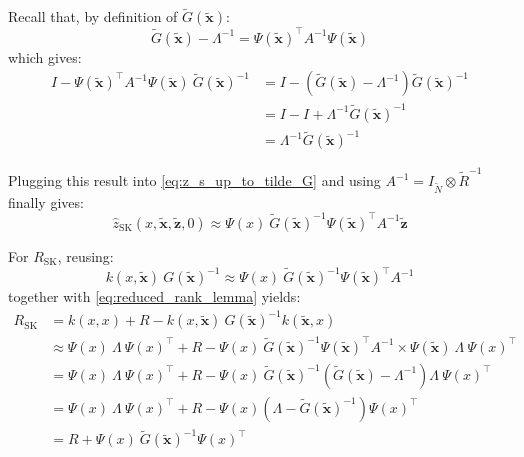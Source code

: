 Recall that, by definition of $\tilde{G}(\tilde{\mathbf{x}})$:
\begin{equation}
	\tilde{G}(\tilde{\mathbf{x}})-\Lambda^{-1}=\Psi(\tilde{\mathbf{x}})^\top A^{-1}\Psi(\tilde{\mathbf{x}})
\end{equation}
which gives:
\begin{equation}
	\begin{aligned}
	I-\Psi(\tilde{\mathbf{x}})^\top A^{-1}\Psi(\tilde{\mathbf{x}})\:\tilde{G}(\tilde{\mathbf{x}})^{-1}&=I-\left(\tilde{G}(\tilde{\mathbf{x}})-\Lambda^{-1}\right)\tilde{G}(\tilde{\mathbf{x}})^{-1}\\
	&=I-I+\Lambda^{-1}\tilde{G}(\tilde{\mathbf{x}})^{-1}\\
	&=\Lambda^{-1}\tilde{G}(\tilde{\mathbf{x}})^{-1}
	\end{aligned}\label{eq:reduced_rank_lemma}
\end{equation}

Plugging this result into \eqref{eq:z_s_up_to_tilde_G} and using $A^{-1}=I_{\tilde{N}}\otimes\tilde{R}^{-1}$ finally gives:
\begin{equation}
	\hat{z}_{\mathrm{SK}}(x,\tilde{\mathbf{x}},\tilde{\mathbf{z}},0)\approx\Psi(x)\:\tilde{G}(\tilde{\mathbf{x}})^{-1}\Psi(\tilde{\mathbf{x}})^\top A^{-1}\tilde{\mathbf{z}}
\end{equation}

For $R_{\mathrm{SK}}$, reusing:
\begin{equation}
	k(x,\tilde{\mathbf{x}})\:G(\tilde{\mathbf{x}})^{-1}\approx\Psi(x)\:\tilde{G}(\tilde{\mathbf{x}})^{-1}\Psi(\tilde{\mathbf{x}})^\top A^{-1}
\end{equation}
together with \eqref{eq:reduced_rank_lemma} yields:
\begin{equation}
	\begin{aligned}
	R_{\mathrm{SK}}&=k(x,x)+R-k(x,\tilde{\mathbf{x}})\:G(\tilde{\mathbf{x}})^{-1}k(\tilde{\mathbf{x}},x)\\
	&\approx\Psi(x)\:\Lambda\:\Psi(x)^\top+R-\Psi(x)\:\tilde{G}(\tilde{\mathbf{x}})^{-1}\Psi(\tilde{\mathbf{x}})^\top A^{-1}\times\Psi(\tilde{\mathbf{x}})\:\Lambda\:\Psi(x)^\top\\
	&=\Psi(x)\:\Lambda\:\Psi(x)^\top+R-\Psi(x)\:\tilde{G}(\tilde{\mathbf{x}})^{-1}\left(\tilde{G}(\tilde{\mathbf{x}})-\Lambda^{-1}\right)\Lambda\:\Psi(x)^\top\\
	&=\Psi(x)\:\Lambda\:\Psi(x)^\top+R-\Psi(x)\left(\Lambda-\tilde{G}(\tilde{\mathbf{x}})^{-1}\right)\Psi(x)^\top\\
	&=R+\Psi(x)\:\tilde{G}(\tilde{\mathbf{x}})^{-1}\Psi(x)^\top
	\end{aligned}
\end{equation}

